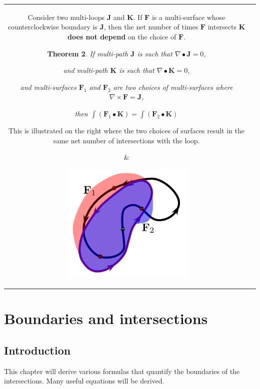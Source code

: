 \documentclass{book}
\newtheorem{thm}{Theorem}
\begin{document}
\begin{tabular}{cc}
\parbox{0.5\textwidth}{
Consider two multi-loops \(\mathbf{J}\) and \(\mathbf{K}\). If \(\mathbf{F}\) is a multi-surface whose counterclockwise boundary is \(\mathbf{J}\), then the net number of times \(\mathbf{F}\) intersects \(\mathbf{K}\) {\bf does not depend} on the choice of \(\mathbf{F}\). 

\begin{thm}
If multi-path \(\mathbf{J}\) is such that \(\nabla \bullet \mathbf{J} = 0\), 

and multi-path \(\mathbf{K}\) is such that \(\nabla \bullet \mathbf{K} = 0\),

and multi-surfaces \(\mathbf{F}_1\) and \(\mathbf{F}_2\) are two choices
of multi-surfaces where \(\nabla \times \mathbf{F} = \mathbf{J}\), 

then \(\int (\mathbf{F}_1 \bullet \mathbf{K}) = \int (\mathbf{F}_2 \bullet \mathbf{K})\)
\end{thm}

This is illustrated on the right where the two choices of surfaces result in the same net number of intersections with the loop.
} & \parbox{0.5\textwidth}{
\includegraphics[width = 0.5\textwidth]{Intersections/Path-surface_intersections/closed_path_and_different_surfaces}
}
\end{tabular}






\chapter{Boundaries and intersections}


\section{Introduction}

This chapter will derive various formulas that quantify the boundaries of the intersections. Many useful equations will be derived.
\end{document}
